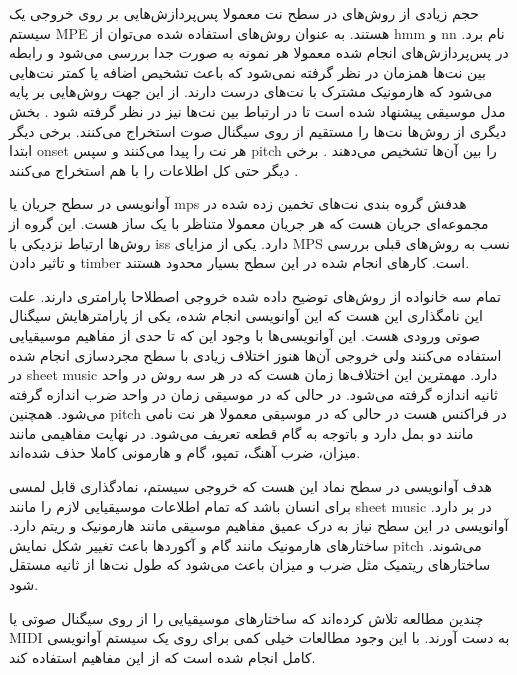 حجم زیادی از روش‌های در سطح نت معمولا پس‌پردازش‌هایی بر روی خروجی یک سیستم
\gls{MPE} هستند. به عنوان روش‌های استفاده شده می‌توان از \gls{hmm}
\cite{nam2011classification} و \gls{nn} \cite{boulanger2012modeling} نام برد. در
پس‌پردازش‌های انجام شده معمولا هر نمونه به صورت جدا بررسی می‌شود و رابطه بین
نت‌ها همزمان در نظر گرفته نمی‌شود که باعث تشخیص اضافه یا کمتر نت‌هایی می‌شود که
هارمونیک مشترک با نت‌های درست دارند. از این جهت روش‌هایی بر پایه مدل موسیقی
پیشنهاد شده است تا در ارتباط بین نت‌ها نیز در نظر گرفته شود
\cite{boulanger2012modeling, sigtia2016end}. بخش دیگری از روش‌ها نت‌ها را مستقیم
از روی سیگنال صوت استخراج می‌کنند. برخی دیگر ابتدا onset هر نت را پیدا می‌کنند و
سپس \gls{pitch} را بین آن‌ها تشخیص می‌دهند \cite{marolt2004connectionist}. برخی
دیگر حتی کل اطلاعات را با هم استخراج می‌کنند
\cite{cogliati2016context,ewert2016piano,hawthorne2017onsets}.

آوانویسی در سطح جریان یا \gls{mps} هدفش گروه بندی نت‌های تخمین زده شده در
مجموعه‌ای جریان هست که هر جریان معمولا متناظر با یک ساز هست. این گروه از روش‌ها
ارتباط نزدیکی با \gls{iss} دارد. یکی از مزایای \gls{MPS} نسب به روش‌های قبلی
بررسی و تاثیر دادن \gls{timber} است. کارهای انجام شده در این سطح بسیار محدود
هستند.

تمام سه خانواده از روش‌های‌ توضیح داده شده خروجی اصطلاحا پارامتری دارند. علت این
نامگذاری این هست که این آوانویسی انجام شده، یکی از پارامترهایش سیگنال صوتی ورودی
هست. این آوانویسی‌ها با وجود این که تا حدی از مفاهیم موسیقیایی استفاده می‌کنند
ولی خروجی آن‌ها هنوز اختلاف زیادی با سطح مجردسازی انجام شده در \gls{sheet music}
دارد. مهمترین این اختلاف‌ها زمان هست که در هر سه روش در واحد ثانیه اندازه گرفته
می‌شود. در حالی که در موسیقی زمان در واحد ضرب اندازه گرفته می‌شود. همچنین
\gls{pitch} در فراکنس هست در حالی که در موسیقی معمولا هر نت نامی مانند دو بمل
دارد و باتوجه به گام قطعه تعریف می‌شود. در نهایت مفاهیمی مانند میزان، ضرب آهنگ،
تمپو، گام و هارمونی کاملا حذف شده‌اند.

هدف آوانویسی در سطح نماد این هست که خروجی سیستم، نمادگذاری قابل لمسی برای انسان
باشد که تمام اطلاعات موسیقیایی لازم را مانند \gls{sheet music} در بر دارد.
آوانویسی در این سطح نیاز به درک عمیق مفاهیم موسیقی مانند هارمونیک و ریتم دارد.
ساختارهای هارمونیک مانند گام و آکوردها باعث تغییر شکل نمایش \gls{pitch} می‌شوند.
ساختارهای ریتمیک مثل ضرب و میزان باعث می‌شود که طول نت‌ها از ثانیه مستقل شود.

چندین مطالعه تلاش کرده‌اند که ساختارهای موسیقیایی را از روی سیگنال صوتی یا
\gls{MIDI} به دست آورند. با این وجود مطالعات خیلی کمی برای روی یک سیستم
آوانویسی کامل انجام شده است که از این مفاهیم استفاده کند.

